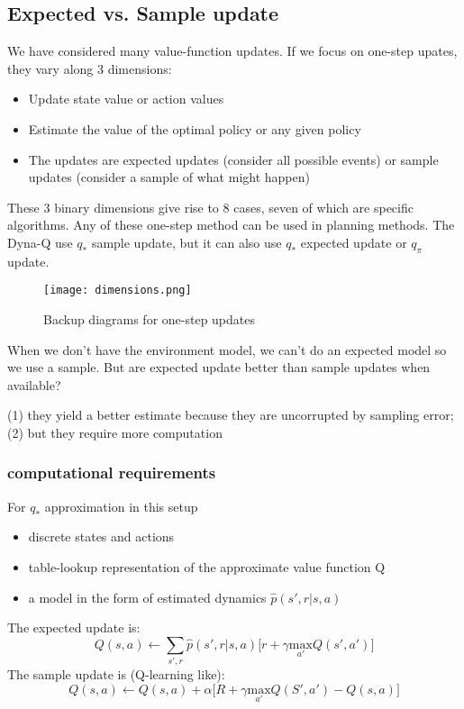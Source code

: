 \documentclass[sutton_barto_notes.tex]{subfiles}
\begin{document}
\subsection{Expected vs. Sample update}

We have considered many value-function updates. If we focus on one-step upates, they vary along 3 dimensions:
\begin{itemize}
\item Update state value or action values
\item Estimate the value of the optimal policy or any given policy
\item The updates are expected updates (consider all possible events) or sample updates (consider a sample of what might happen)
\end{itemize}
These 3 binary dimensions give rise to 8 cases, seven of which are specific algorithms.
Any of these one-step method can be used in planning methods. The Dyna-Q use $q_*$ sample update, but it can also use $q_*$ expected update or $q_\pi$ update.

\begin{figure}[h!]
    \centering
    \texttt{[image: dimensions.png]}
    \caption{ Backup diagrams for one-step updates }
\end{figure}

When we don’t have the environment model, we can’t do an expected model so we use a sample. But are expected update better than sample updates when available?

(1) they yield a better estimate because they are uncorrupted by sampling error; (2) but they require more computation

\subsubsection{computational requirements}

For $q_*$ approximation in this setup
\begin{itemize}
\item discrete states and actions
\item table-lookup representation of the approximate value function Q
\item a model in the form of estimated dynamics $\hat{p}(s',r|s,a)$
\end{itemize}
The expected update is:
$$ Q(s, a) \gets \sum_{s', r} \hat{p}(s', r|s, a) \big[r + \gamma \underset{a'}{\mathrm{max}} Q(s', a')\big] $$
The sample update is (Q-learning like):
$$ Q(s, a) \gets Q(s, a) + \alpha \big[ R + \gamma \underset{a'}{\mathrm{max}} Q(S', a') - Q(s, a)\big] $$
\end{document}
